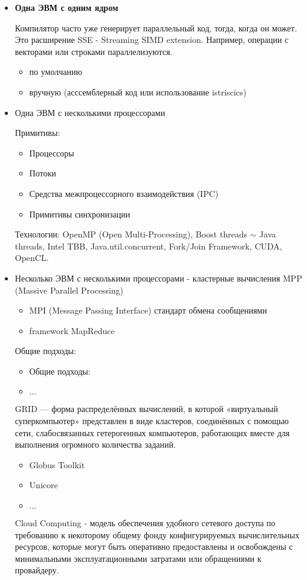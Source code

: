 \begin{itemize}
	\item \textbf{Одна ЭВМ с одним ядром}
	
		Компилятор часто уже генерирует параллельный код, тогда, когда он может. Это расширение SSE - Streaming SIMD extension. Например, операции с векторами или строками параллелизуются.
		\begin{itemize}
			\item по умолчанию
			\item вручную (асссемблерный код или использование istriscics)
		\end{itemize}
	
	\item Одна ЭВМ с несколькими процессорами
	
		Примитивы:
		\begin{itemize}
			\item Процессоры
			\item Потоки
			\item Средства межпроцессорного взаимодействия (IPC)
			\item Примитивы синхронизации
		\end{itemize}
		Технологии: OpenMP (Open Multi-Processing), Boost threads $\sim$ Java threads, Intel TBB, Java.util.concurrent, Fork/Join Framework, CUDA, OpenCL.
		
	\item Несколько ЭВМ с несколькими процессорами - кластерные вычисления MPP (Massive Parallel Processing)
	
		\begin{itemize}
			\item MPI (Message Passing Interface) стандарт обмена сообщениями
			\item framework MapReduce
		\end{itemize}
		Общие подходы:
		\begin{itemize}
			\item Общие подходы:
			\item $\dots$
		\end{itemize}
		GRID — форма распределённых вычислений, в которой «виртуальный суперкомпьютер» представлен в виде кластеров, соединённых с помощью сети, слабосвязанных гетерогенных компьютеров, работающих вместе для выполнения огромного количества заданий.
		\begin{itemize}
			\item Globus Toolkit
			\item Unicore
			\item $\dots$
		\end{itemize}
	
		Cloud Computing - модель обеспечения удобного сетевого доступа по требованию к некоторому общему фонду конфигурируемых вычислительных ресурсов, которые могут быть оперативно предоставлены и освобождены с минимальными эксплуатационными затратами или обращениями к провайдеру.
\end{itemize}

